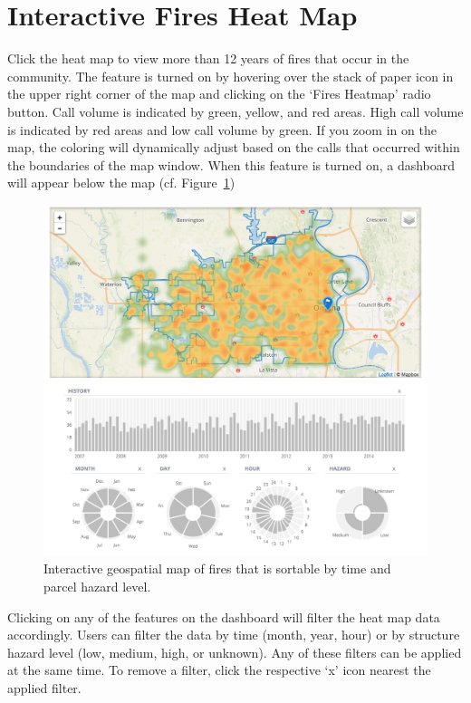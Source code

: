 \documentclass[12pt,oneside]{book}
\begin{document}
\FloatBarrier

\section{Interactive Fires Heat Map}

Click the heat map to view more than 12 years of fires that occur in the community. The feature is turned on by hovering over the stack of paper icon in the upper right corner of the map and clicking on the `Fires Heatmap' radio button. Call volume is indicated by green, yellow, and red areas. High call volume is indicated by red areas and low call volume by green. If you zoom in on the map, the coloring will dynamically adjust based on the calls that occurred within the boundaries of the map window. When this feature is turned on, a dashboard will appear below the map (cf. Figure~\ref{fig:interactive_fire_map})

\begin{figure}[ht!]
\centering
\includegraphics[width=.9\columnwidth]{Figures/interactive_fire_map}
\caption{Interactive geospatial map of fires that is sortable by time and parcel hazard level.}
\label{fig:interactive_fire_map}
\end{figure}

Clicking on any of the features on the dashboard will filter the heat map data accordingly. Users can filter the data by time (month, year, hour) or by structure hazard level (low, medium, high, or unknown). Any of these filters can be applied at the same time. To remove a filter, click the respective `x' icon nearest the applied filter.
\end{document}
